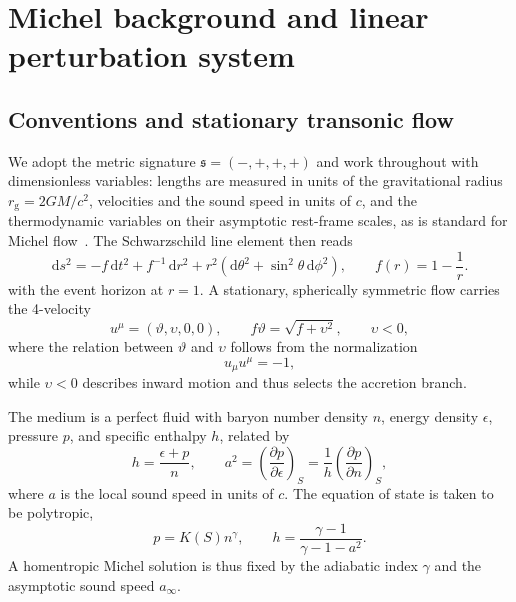 \documentclass[12pt,a4paper,preprint,nopreprintline]{elsarticle}
\begin{document}
\section{Michel background and linear perturbation system}
\label{sec:background}

\subsection{Conventions and stationary transonic flow}
\label{sec:michel_background}

We adopt the metric signature $\mathfrak{s}=(-,+,+,+)$ and work throughout with dimensionless variables: lengths are measured in units of the gravitational radius $r_{\mathrm{g}}=2GM/c^{2}$, velocities and the sound speed in units of $c$, and the thermodynamic variables on their asymptotic rest-frame scales, as is standard for Michel flow~\cite{MichelFC_AccretionOfMatterByCondensedObjects_1972,MoncriefV_StabilityOfStationarySphericalAccretionOntoASchwarzschildBlackHole_1980}. The Schwarzschild line element then reads
\begin{equation}
    \mathrm{d}s^{2}
    =
    -f\,\mathrm{d}t^{2}
    +f^{-1}\,\mathrm{d}r^{2}
    +r^{2}\left(
        \mathrm{d}\theta^{2}
        +\sin^{2}\theta\,\mathrm{d}\phi^{2}
    \right),
    \qquad
    f(r)=1-\frac{1}{r}.
    \label{eq:schwarzschild_metric}
\end{equation}
with the event horizon at $r=1$. A stationary, spherically symmetric flow carries the 4-velocity
\begin{equation}
    u^{\mu}=(\vartheta,\upsilon,0,0),
    \qquad
    f\vartheta=\sqrt{f+\upsilon^{2}},
    \qquad
    \upsilon<0,
    \label{eq:background_velocity}
\end{equation}
where the relation between $\vartheta$ and $\upsilon$ follows from the normalization
\begin{equation}
    u_{\mu}u^{\mu}=-1,
    \label{eq:four_velocity_normalization}
\end{equation}
while $\upsilon<0$ describes inward motion and thus selects the accretion branch.

The medium is a perfect fluid with baryon number density $n$, energy density $\epsilon$, pressure $p$, and specific enthalpy $h$, related by
\begin{equation}
    h=\frac{\epsilon+p}{n},
    \qquad
    a^{2}=
    \left(\frac{\partial p}{\partial\epsilon}\right)_{S}=
    \frac{1}{h}\left(\frac{\partial p}{\partial n}\right)_{S},
    \label{eq:enthalpy_sound_speed}
\end{equation}
where $a$ is the local sound speed in units of $c$. The equation of state is taken to be polytropic,
\begin{equation}
    p=K(S)n^{\gamma},
    \qquad
    h=\frac{\gamma-1}{\gamma-1-a^{2}}.
    \label{eq:polytropic_closure}
\end{equation}
A homentropic Michel solution is thus fixed by the adiabatic index $\gamma$ and the asymptotic sound speed $a_{\infty}$.
\end{document}
